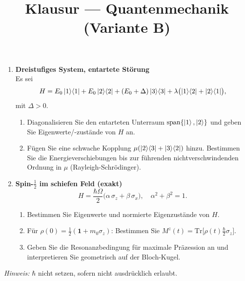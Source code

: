 \documentclass[11pt,a4paper]{article}
\begin{document}
\begin{enumerate}
\item \textbf{Dreistufiges System, entartete Störung}\\
Es sei
\[
H=E_0\ket1\!\bra1+E_0\ket2\!\bra2+(E_0+\Delta)\ket3\!\bra3
+\lambda\bigl(\ket1\!\bra2+\ket2\!\bra1\bigr),
\]
mit \(\Delta>0\).
\begin{enumerate}
  \item Diagonalisieren Sie den entarteten Unterraum \(\mathrm{span}\{\ket1,\ket2\}\) und geben Sie Eigenwerte/-zustände von \(H\) an.
  \item Fügen Sie eine schwache Kopplung \(\mu(\ket2\!\bra3+\ket3\!\bra2)\) hinzu. Bestimmen Sie die Energieverschiebungen bis zur führenden nichtverschwindenden Ordnung in \(\mu\) (Rayleigh-Schrödinger).
\end{enumerate}

\item \textbf{Spin-\(\tfrac12\) im schiefen Feld (exakt)}\\
\[
H=\frac{\hbar\Omega}{2}\bigl(\alpha\,\sigma_z+\beta\,\sigma_x\bigr),\quad \alpha^2+\beta^2=1.
\]
\begin{enumerate}
  \item Bestimmen Sie Eigenwerte und normierte Eigenzustände von \(H\).
  \item Für \(\rho(0)=\tfrac12(\mathbf1+m_0\sigma_z)\): Bestimmen Sie \(M^z(t)=\mathrm{Tr}\bigl[\rho(t)\tfrac{\hbar}{2}\sigma_z\bigr]\).
  \item Geben Sie die Resonanzbedingung für maximale Präzession an und interpretieren Sie geometrisch auf der Bloch-Kugel.
\end{enumerate}

\end{enumerate}
\vfill
\noindent\textit{Hinweis:} \(\hbar\) nicht setzen, sofern nicht ausdrücklich erlaubt.


\pagebreak

\title{Klausur — Quantenmechanik (Variante B)}\author{}\date{}
\end{document}
